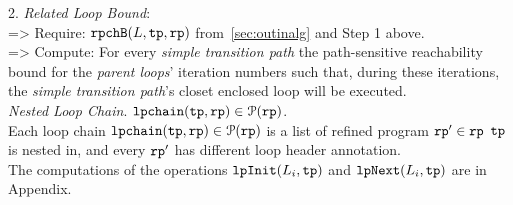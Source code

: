 2. \emph{Related Loop Bound}:
\\
=> Require: ${\mathtt{rpchB}}(L, {\mathtt{tp}},  {\mathtt{rp}})$ from~\ref{sec:outinalg} and Step 1 above.
\\
=> Compute: For every \emph{simple transition path} the path-sensitive
reachability bound for the \emph{parent loops}' iteration numbers
such that, during these iterations, the \emph{simple transition path}'s closet enclosed loop will be executed. 
\\
\emph{Nested Loop Chain}.  ${\mathtt{lpchain}}({\mathtt{tp}}, {\mathtt{rp}}) \in \mathcal{P}({\mathtt{rp}})$.
\\
  Each loop chain ${\mathtt{lpchain}}({\mathtt{tp}}, {\mathtt{rp}}) \in \mathcal{P}({\mathtt{rp}})$ 
  is a list of refined program ${\mathtt{rp}}' \in {\mathtt{rp}}$
  ${\mathtt{tp}}$ is nested in, and every ${\mathtt{rp}}'$ has different loop header annotation.
\\
The computations of the operations ${\mathtt{lpInit}}(L_i, {\mathtt{tp}})$ and ${\mathtt{lpNext}}(L_i, {\mathtt{tp}})$ are in Appendix.
